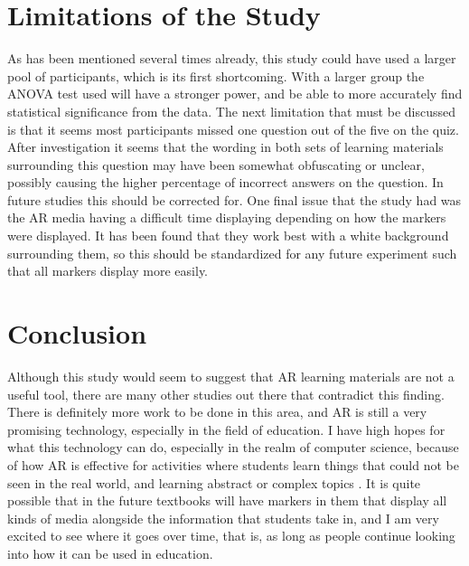 \documentclass[sigconf]{acmart}
\begin{document}
\section{Limitations of the Study}
As has been mentioned several times already, this study could have used a larger pool of participants, which is its first shortcoming. With a larger group the ANOVA test used will have a stronger power, and be able to more accurately find statistical significance from the data. The next limitation that must be discussed is that it seems most participants missed one question out of the five on the quiz. After investigation it seems that the wording in both sets of learning materials surrounding this question may have been somewhat obfuscating or unclear, possibly causing the higher percentage of incorrect answers on the question. In future studies this should be corrected for. One final issue that the study had was the AR media having a difficult time displaying depending on how the markers were displayed. It has been found that they work best with a white background surrounding them, so this should be standardized for any future experiment such that all markers display more easily.

\section{Conclusion}
Although this study would seem to suggest that AR learning materials are not a useful tool, there are many other studies out there that contradict this finding. There is definitely more work to be done in this area, and AR is still a very promising technology, especially in the field of education. I have high hopes for what this technology can do, especially in the realm of computer science, because of how AR is effective for activities where students learn things that could not be seen in the real world, and learning abstract or complex topics \cite{chen17}. It is quite possible that in the future textbooks will have markers in them that display all kinds of media alongside the information that students take in, and I am very excited to see where it goes over time, that is, as long as people continue looking into how it can be used in education.



\end{document}
